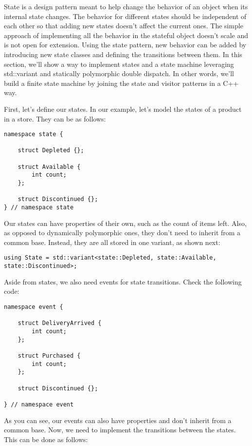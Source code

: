 State is a design pattern meant to help change the behavior of an object when its internal state changes. The behavior for different states should be independent of each other so that adding new states doesn't affect the current ones. The simple approach of implementing all the behavior in the stateful object doesn't scale and is not open for extension. Using the state pattern, new behavior can be added by introducing new state classes and defining the transitions between them. In this section, we'll show a way to implement states and a state machine leveraging std::variant and statically polymorphic double dispatch. In other words, we'll build a finite state machine by joining the state and visitor patterns in a C++ way.

First, let's define our states. In our example, let's model the states of a product in a store. They can be as follows:

\begin{lstlisting}[style=styleCXX]
namespace state {
	
	struct Depleted {};
	
	struct Available {
		int count;
	};

	struct Discontinued {};
} // namespace state
\end{lstlisting}

Our states can have properties of their own, such as the count of items left. Also, as opposed to dynamically polymorphic ones, they don't need to inherit from a common base. Instead, they are all stored in one variant, as shown next:

\begin{lstlisting}[style=styleCXX]
using State = std::variant<state::Depleted, state::Available,
state::Discontinued>;
\end{lstlisting}

Aside from states, we also need events for state transitions. Check the following code:

\begin{lstlisting}[style=styleCXX]
namespace event {
	
	struct DeliveryArrived {
		int count;
	};

	struct Purchased {
		int count;
	};

	struct Discontinued {};
	
} // namespace event
\end{lstlisting}

As you can see, our events can also have properties and don't inherit from a common base. Now, we need to implement the transitions between the states. This can be done as follows:

